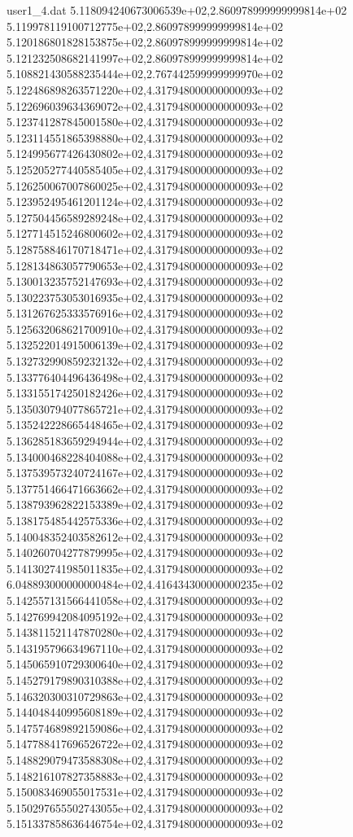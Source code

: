 \begin{filecontents}{user1_4.dat}
5.118094240673006539e+02,2.860978999999999814e+02
5.119978119100712775e+02,2.860978999999999814e+02
5.120186801828153875e+02,2.860978999999999814e+02
5.121232508682141997e+02,2.860978999999999814e+02
5.108821430588235444e+02,2.767442599999999970e+02
5.122486898263571220e+02,4.317948000000000093e+02
5.122696039634369072e+02,4.317948000000000093e+02
5.123741287845001580e+02,4.317948000000000093e+02
5.123114551865398880e+02,4.317948000000000093e+02
5.124995677426430802e+02,4.317948000000000093e+02
5.125205277440585405e+02,4.317948000000000093e+02
5.126250067007860025e+02,4.317948000000000093e+02
5.123952495461201124e+02,4.317948000000000093e+02
5.127504456589289248e+02,4.317948000000000093e+02
5.127714515246800602e+02,4.317948000000000093e+02
5.128758846170718471e+02,4.317948000000000093e+02
5.128134863057790653e+02,4.317948000000000093e+02
5.130013235752147693e+02,4.317948000000000093e+02
5.130223753053016935e+02,4.317948000000000093e+02
5.131267625333576916e+02,4.317948000000000093e+02
5.125632068621700910e+02,4.317948000000000093e+02
5.132522014915006139e+02,4.317948000000000093e+02
5.132732990859232132e+02,4.317948000000000093e+02
5.133776404496436498e+02,4.317948000000000093e+02
5.133155174250182426e+02,4.317948000000000093e+02
5.135030794077865721e+02,4.317948000000000093e+02
5.135242228665448465e+02,4.317948000000000093e+02
5.136285183659294944e+02,4.317948000000000093e+02
5.134000468228404088e+02,4.317948000000000093e+02
5.137539573240724167e+02,4.317948000000000093e+02
5.137751466471663662e+02,4.317948000000000093e+02
5.138793962822153389e+02,4.317948000000000093e+02
5.138175485442575336e+02,4.317948000000000093e+02
5.140048352403582612e+02,4.317948000000000093e+02
5.140260704277879995e+02,4.317948000000000093e+02
5.141302741985011835e+02,4.317948000000000093e+02
6.048893000000000484e+02,4.416434300000000235e+02
5.142557131566441058e+02,4.317948000000000093e+02
5.142769942084095192e+02,4.317948000000000093e+02
5.143811521147870280e+02,4.317948000000000093e+02
5.143195796634967110e+02,4.317948000000000093e+02
5.145065910729300640e+02,4.317948000000000093e+02
5.145279179890310388e+02,4.317948000000000093e+02
5.146320300310729863e+02,4.317948000000000093e+02
5.144048440995608189e+02,4.317948000000000093e+02
5.147574689892159086e+02,4.317948000000000093e+02
5.147788417696526722e+02,4.317948000000000093e+02
5.148829079473588308e+02,4.317948000000000093e+02
5.148216107827358883e+02,4.317948000000000093e+02
5.150083469055017531e+02,4.317948000000000093e+02
5.150297655502743055e+02,4.317948000000000093e+02
5.151337858636446754e+02,4.317948000000000093e+02

\end{filecontents}
